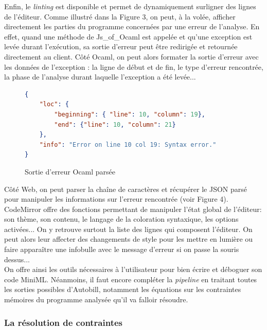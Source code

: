 \documentclass[12pt]{article}
\begin{document}
Enfin, le \textit{linting} est disponible et permet de dynamiquement surligner des lignes de l'éditeur. Comme illustré dans la Figure 3, on peut, à la volée, afficher directement les parties du programme concernées par une erreur de l'analyse. En effet, quand une méthode de Js\_of\_Ocaml est appelée et qu'une exception est levée durant l'exécution, sa sortie d'erreur peut être redirigée et retournée directement au client. Côté Ocaml, on peut alors formater la sortie d'erreur avec les données de l'exception : la ligne de début et de fin, le type d'erreur rencontrée, la phase de l'analyse durant laquelle l'exception a été levée... \\
\begin{figure}
  \centering
  \begin{lstlisting}[language=json,firstnumber=1]
{
    "loc": {
        "beginning": { "line": 10, "column": 19},
        "end": {"line": 10, "column": 21}
    },
    "info": "Error on line 10 col 19: Syntax error."
}
\end{lstlisting}
\caption{Sortie d'erreur Ocaml parsée}
\end{figure}

Côté Web, on peut parser la chaîne de caractères et récupérer le JSON parsé pour manipuler les informations sur l'erreur rencontrée (voir Figure 4). CodeMirror offre des fonctions permettant de manipuler l'état global de l'éditeur: son thème, son contenu, le langage de la coloration syntaxique, les options activées... On y retrouve surtout la liste des lignes qui composent l'éditeur. On peut alors leur affecter des changements de style pour les mettre en lumière ou faire apparaître une infobulle avec le message d'erreur si on passe la souris dessus... \\ 

On offre ainsi les outils nécessaires à l'utilisateur pour bien écrire et déboguer son code MiniML. Néanmoins, il faut encore compléter la \textit{pipeline} en traitant toutes les sorties possibles d'Autobill, notamment les équations sur les contraintes mémoires du programme analysée qu'il va falloir résoudre.

\subsubsection{La résolution de contraintes}\
\end{document}
